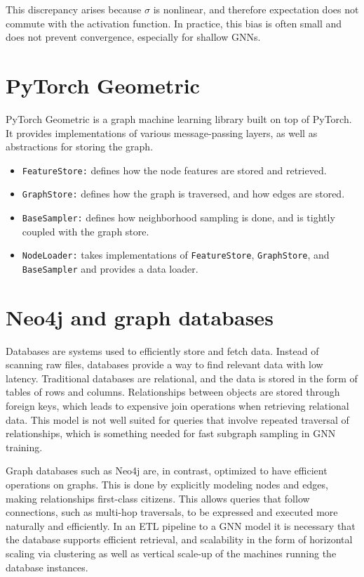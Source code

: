\documentclass[PhD,single]{uclathes}
\begin{document}
This discrepancy arises because $\sigma$ is nonlinear, and therefore
expectation does not commute with the activation function. In practice, this
bias is often small and does not prevent convergence, especially for shallow
GNNs.

\section{PyTorch Geometric}\label{sec:pyg}
PyTorch Geometric is a graph machine learning library built on top of PyTorch.
It provides implementations of various message-passing layers, as well as
abstractions for storing the graph.

\begin{itemize}
    \item \texttt{FeatureStore:} defines how the node features are stored and retrieved.
    \item \texttt{GraphStore:} defines how the graph is traversed, and how edges are stored.
    \item \texttt{BaseSampler:} defines how neighborhood sampling is done, and is tightly coupled with the graph store.
    \item \texttt{NodeLoader:} takes implementations of \texttt{FeatureStore}, \texttt{GraphStore}, and \texttt{BaseSampler} and provides a data loader.
\end{itemize}

\section{Neo4j and graph databases}
Databases are systems used to efficiently store and fetch data. Instead of
scanning raw files, databases provide a way to find relevant data with low
latency. Traditional databases are relational, and the data is stored in the
form of tables of rows and columns. Relationships between objects are stored
through foreign keys, which leads to expensive join operations when retrieving
relational data. This model is not well suited for queries that involve
repeated traversal of relationships, which is something needed for fast
subgraph sampling in GNN training.

Graph databases such as Neo4j are, in contrast, optimized to have efficient
operations on graphs. This is done by explicitly modeling nodes and edges,
making relationships first-class citizens. This allows queries that follow
connections, such as multi-hop traversals, to be expressed and executed more
naturally and efficiently. In an ETL pipeline to a GNN model it is necessary
that the database supports efficient retrieval, and scalability in the form of
horizontal scaling via clustering as well as vertical scale-up of the machines
running the database instances.
\end{document}
